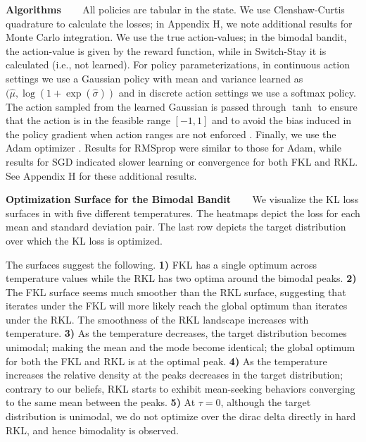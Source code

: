 \documentclass[twoside,11pt]{article}
\newcommand{\myparagraph}[1]{\textbf{#1} \ \ \ }
\begin{document}
\myparagraph{Algorithms} 
All policies are tabular in the state. We use Clenshaw-Curtis quadrature \citep{clenshaw1960method} to calculate the losses; in Appendix H, we note additional results for Monte Carlo integration. We use the true action-values; in the bimodal bandit, the action-value is given by the reward function, while in Switch-Stay it is calculated (i.e., not learned). For policy parameterizations, in continuous action settings we use a Gaussian policy with mean and variance learned as $(\hat{\mu}, \log(1+\exp(\hat{\sigma}))$ and in discrete action settings we use a softmax policy. The action sampled from the learned Gaussian is passed through $\tanh$ to ensure that the action is in the feasible range $[-1, 1]$ and to avoid the bias induced in the policy gradient when action ranges are not enforced \citep{chou2017improving}. Finally, we use the Adam optimizer \citep{kingma2014adam}. Results for RMSprop were similar to those for Adam, while results for SGD indicated slower learning or convergence for both FKL and RKL. See Appendix H for these additional results. 


\myparagraph{Optimization Surface for the Bimodal Bandit}
We visualize the KL loss surfaces in  with five different temperatures. The heatmaps depict the loss for each mean and standard deviation pair. The last row depicts the target distribution over which the KL loss is optimized. 

The surfaces suggest the following. 
\textbf{1)} FKL has a single optimum across temperature values while the RKL has two optima around the bimodal peaks.
\textbf{2)} The FKL surface seems much smoother than the RKL surface, suggesting that iterates under the FKL will more likely reach the global optimum than iterates under the RKL. The smoothness of the RKL landscape increases with temperature.
\textbf{3)} As the temperature decreases, the target distribution becomes unimodal; making the mean and the mode become identical; the global optimum for both the FKL and RKL is at the optimal peak.
\textbf{4)} As the temperature increases the relative density at the peaks decreases in the target distribution; contrary to our beliefs, RKL starts to exhibit mean-seeking behaviors converging to the same mean between the peaks. 
\textbf{5)} At $\tau=0$, although the target distribution is unimodal, we do not optimize over the dirac delta directly in hard RKL, and hence bimodality is observed.
\end{document}
